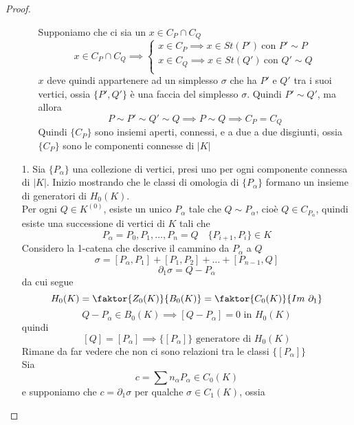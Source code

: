 \documentclass[a4paper]{report}
\newcommand{\pskel}[2]{\ensuremath{{#1}^{({#2})}}}
\begin{document}
\begin{proof}
\begin{enumerate}
\begin{enumerate}
                      Supponiamo che ci sia un $x\in C_P\cap C_Q$
                      \[
                          x\in C_P\cap C_Q\implies\begin{cases}
                              x\in C_P\implies x\in St(P')\ \text{con }P'\sim P \\
                              x\in C_Q\implies x\in St(Q')\ \text{con }Q'\sim Q \\
                          \end{cases}
                      \]
                      $x$ deve quindi appartenere ad un simplesso $\sigma$ che ha $P'$ e $Q'$ tra i suoi vertici, ossia $\{P',Q'\}$ è una faccia del simplesso $\sigma$. Quindi $P'\sim Q'$, ma allora
                      \[
                          P\sim P'\sim Q'\sim Q\implies P\sim Q\implies C_P=C_Q
                      \]
                      Quindi $\{C_P\}$ sono insiemi aperti, connessi, e a due a due disgiunti, ossia $\{C_P\}$ sono le componenti connesse di $|K|$
            \end{enumerate}
        \item[1.] Sia $\{P_\alpha\}$ una collezione di vertici, presi uno per ogni componente connessa di $|K|$. Inizio mostrando che le classi di omologia di $\{P_\alpha\}$ formano un insieme di generatori di $H_0(K)$.\\
            Per ogni $Q\in\pskel{K}{0}$, esiste un unico $P_\alpha$ tale che $Q\sim P_\alpha$, cioè $Q\in C_{P_\alpha}$, quindi esiste una successione di vertici di $K$ tali che
            \[
                P_\alpha=P_0,P_1,\dots,P_n=Q\quad \{P_{i+1},P_i\}\in K
            \]
            Considero la 1-catena che descrive il cammino da $P_\alpha$ a $Q$
            \[
                \sigma=[P_\alpha,P_1]+[P_1,P_2]+\dots+[P_{n-1},Q]
            \]
            \[
                \partial_1\sigma=Q-P_\alpha
            \]
            da cui segue
            \[
                H_0(K)=\faktor{Z_0(K)}{B_0(K)}=\faktor{C_0(K)}{Im\ \partial_1}
            \]
            \[
                Q-P_\alpha\in B_0(K)\implies [Q-P_\alpha]=0\text{ in }H_0(K)
            \]
            quindi
            \[
                [Q]=[P_\alpha]\implies \{[P_\alpha]\}\text{ generatore di }H_0(K)
            \]
            Rimane da far vedere che non ci sono relazioni tra le classi $\{[P_\alpha]\}$\\
            Sia
            \[
                c=\sum n_\alpha P_\alpha\in C_0(K)
            \]
            e supponiamo che $c=\partial_1\sigma$ per qualche $\sigma\in C_1(K)$, ossia

\end{enumerate}
\end{proof}
\end{document}
